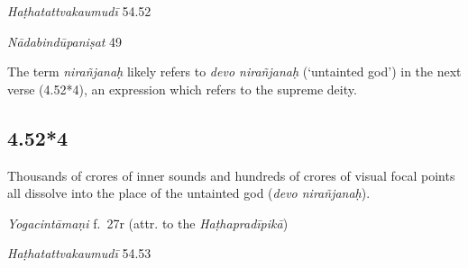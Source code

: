 \begin{ekdosis}
\begin{testimonia}[hp04_052_3]
\emph{Haṭhatattvakaumudī} 54.52
\begin{versinnote}
\end{versinnote}

\emph{Nādabindūpaniṣat} 49
\begin{versinnote}
\end{versinnote}
\end{testimonia}

\begin{philcomm}[hp04_052_3]
The term \emph{nirañjanaḥ} likely refers to \emph{devo nirañjanaḥ} (`untainted god') in the next verse (4.52*4), an expression which refers to the supreme deity.
\end{philcomm}

\subsection*{4.52*4}
\begin{translation}[hp04_052_4]
Thousands of crores of inner sounds and hundreds of crores of visual focal points all dissolve into the place of the untainted god (\emph{devo nirañjanaḥ}).
%
\end{translation}


\begin{testimonia}[hp04_052_4]
\emph{Yogacintāmaṇi} f.~27r (attr. to the \emph{Haṭhapradīpikā})
\begin{versinnote}
\end{versinnote}

\emph{Haṭhatattvakaumudī} 54.53
\begin{versinnote}
\end{versinnote}


\end{testimonia}
\end{ekdosis}
